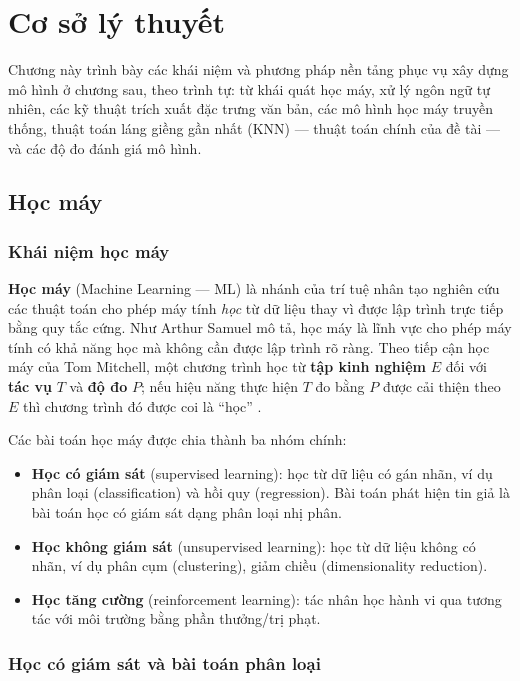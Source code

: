 \chapter[CƠ SỞ LÝ THUYẾT]{Cơ sở lý thuyết}

Chương này trình bày các khái niệm và phương pháp nền tảng phục vụ xây dựng mô hình ở chương sau, theo trình tự: từ khái quát học máy, xử lý ngôn ngữ tự nhiên, các kỹ thuật trích xuất đặc trưng văn bản, các mô hình học máy truyền thống, thuật toán láng giềng gần nhất (KNN) --- thuật toán chính của đề tài --- và các độ đo đánh giá mô hình.

\section{Học máy}

\subsection{Khái niệm học máy}

\textbf{Học máy} (Machine Learning --- ML) là nhánh của trí tuệ nhân tạo nghiên cứu các thuật toán cho phép máy tính \textit{học} từ dữ liệu thay vì được lập trình trực tiếp bằng quy tắc cứng. Như Arthur Samuel mô tả, học máy là lĩnh vực cho phép máy tính có khả năng học mà không cần được lập trình rõ ràng. Theo tiếp cận học máy của Tom Mitchell, một chương trình học từ \textbf{tập kinh nghiệm} $E$ đối với \textbf{tác vụ} $T$ và \textbf{độ đo} $P$; nếu hiệu năng thực hiện $T$ đo bằng $P$ được cải thiện theo $E$ thì chương trình đó được coi là ``học'' \cite{tiep}.

Các bài toán học máy được chia thành ba nhóm chính:

\begin{itemize}
    \item \textbf{Học có giám sát} (supervised learning): học từ dữ liệu có gán nhãn, ví dụ phân loại (classification) và hồi quy (regression). Bài toán phát hiện tin giả là bài toán học có giám sát dạng phân loại nhị phân.
    \item \textbf{Học không giám sát} (unsupervised learning): học từ dữ liệu không có nhãn, ví dụ phân cụm (clustering), giảm chiều (dimensionality reduction).
    \item \textbf{Học tăng cường} (reinforcement learning): tác nhân học hành vi qua tương tác với môi trường bằng phần thưởng/trị phạt.
\end{itemize}

\subsection{Học có giám sát và bài toán phân loại}

